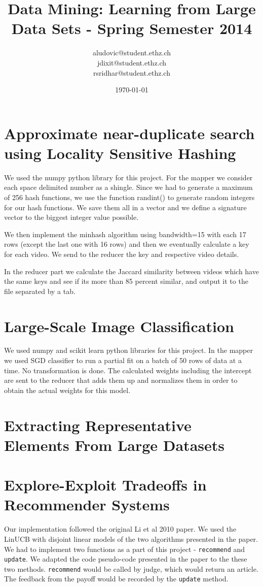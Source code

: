 \documentclass[a4paper, 11pt]{article}
\title{Data Mining: Learning from Large Data Sets - Spring Semester 2014}
\author{aludovic@student.ethz.ch\\ jdixit@student.ethz.ch\\ rsridhar@student.ethz.ch\\}
\date{\today}
\begin{document}
\maketitle

\section{Approximate near-duplicate search using Locality Sensitive Hashing} 

We used the numpy python library for this project. For the mapper we consider each space delimited number as a shingle. Since we had to generate a maximum
of 256 hash functions, we use the function randint() to generate random integers for our hash functions. We save them all in a vector and we define a signature
vector to the biggest integer value possible.

We then implement the minhash algorithm using bandwidth=15 with each 17 rows (except the last one with 16 rows) and then we eventually calculate a key for
each video. We send to the reducer the key and respective video details.

In the reducer part we calculate the Jaccard similarity between videos which have the same keys and see if its more than 85 percent similar, and output
it to the file separated by a tab.

\section{Large-Scale Image Classification}

We used numpy and scikit learn python libraries for this project. In the mapper we used SGD classifier to run a partial fit on a batch of 50 rows of data
at a time. No transformation is done. The calculated weights including the intercept are sent to the reducer that adds them up and normalizes them in order
to obtain the actual weights for this model.

\section{Extracting Representative Elements From Large Datasets}


\section{Explore-Exploit Tradeoffs in Recommender Systems}

Our implementation followed the original Li et al 2010 paper. We used the LinUCB with disjoint linear models of the two algorithms presented in the paper.
We had to implement two functions as a part of this project - \lstinline{recommend} and \lstinline{update}. We adapted the code pseudo-code presented in the
paper to the these two methods. \lstinline{recommend} would be called by judge, which would return an article. The feedback from the payoff would be recorded
by the \lstinline{update} method.
\end{document}
